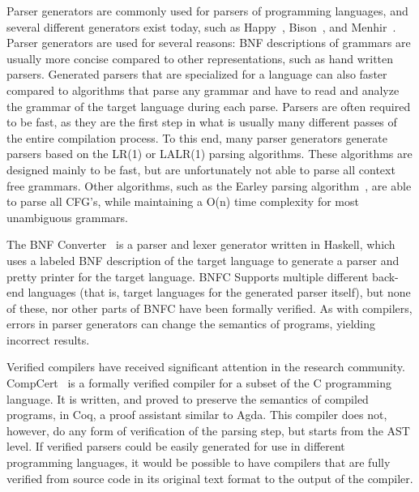 \documentclass{article}
\begin{document}
	Parser generators are commonly used for parsers of programming languages,
	and several different generators exist today, such as Happy~\cite{Happy},
	Bison~\cite{Bison}, and Menhir~\cite{Menhir}. Parser generators are used
	for several reasons: BNF descriptions of grammars are usually more concise
	compared to other representations, such as hand written parsers. Generated
	parsers that are specialized for a language can also faster compared to
	algorithms that parse any grammar and have to read and analyze the grammar
	of the target language during each parse. Parsers are often required to be
	fast, as they are the first step in what is usually many different passes
	of the entire compilation process. To this end, many parser generators
	generate parsers based on the LR(1) or LALR(1) parsing algorithms. These
	algorithms are designed mainly to be fast, but are unfortunately not able
	to parse all context free grammars.  Other algorithms, such as the Earley
	parsing algorithm~\cite{Earley}, are able to parse all CFG's, while
	maintaining a O(n) time complexity for most unambiguous grammars.

	The BNF Converter~\cite{BNFC} is a parser and lexer generator written in
	Haskell, which uses a labeled BNF description of the target language to
	generate a parser and pretty printer for the target language. BNFC Supports
	multiple different back-end languages (that is, target languages for the
	generated parser itself), but none of these, nor other parts of BNFC have
	been formally verified. As with compilers, errors in parser generators can
	change the semantics of programs, yielding incorrect results. 
	
	

	Verified compilers have received significant attention in the research
	community. CompCert~\cite{Leroy} is a formally verified compiler for a
	subset of the C programming language. It is written, and proved to preserve
	the semantics of compiled programs, in Coq, a proof assistant similar to
	Agda. This compiler does not, however, do any form of verification of the
	parsing step, but starts from the AST level. If verified parsers could be
	easily generated for use in different programming languages, it would be
	possible to have compilers that are fully verified from source code in its
	original text format to the output of the compiler.
	
\end{document}
